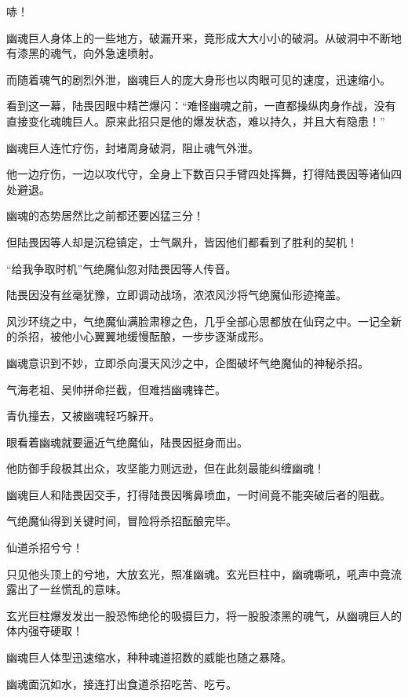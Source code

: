 
\begin{this_body}

哧！

幽魂巨人身体上的一些地方，破漏开来，竟形成大大小小的破洞。从破洞中不断地有漆黑的魂气，向外急速喷射。

而随着魂气的剧烈外泄，幽魂巨人的庞大身形也以肉眼可见的速度，迅速缩小。

看到这一幕，陆畏因眼中精芒爆闪：“难怪幽魂之前，一直都操纵肉身作战，没有直接变化魂魄巨人。原来此招只是他的爆发状态，难以持久，并且大有隐患！”

幽魂巨人连忙疗伤，封堵周身破洞，阻止魂气外泄。

他一边疗伤，一边以攻代守，全身上下数百只手臂四处挥舞，打得陆畏因等诸仙四处避退。

幽魂的态势居然比之前都还要凶猛三分！

但陆畏因等人却是沉稳镇定，士气飙升，皆因他们都看到了胜利的契机！

“给我争取时机”气绝魔仙忽对陆畏因等人传音。

陆畏因没有丝毫犹豫，立即调动战场，浓浓风沙将气绝魔仙形迹掩盖。

风沙环绕之中，气绝魔仙满脸肃穆之色，几乎全部心思都放在仙窍之中。一记全新的杀招，被他小心翼翼地缓慢酝酿，一步步逐渐成形。

幽魂意识到不妙，立即杀向漫天风沙之中，企图破坏气绝魔仙的神秘杀招。

气海老祖、吴帅拼命拦截，但难挡幽魂锋芒。

青仇撞去，又被幽魂轻巧躲开。

眼看着幽魂就要逼近气绝魔仙，陆畏因挺身而出。

他防御手段极其出众，攻坚能力则远逊，但在此刻最能纠缠幽魂！

幽魂巨人和陆畏因交手，打得陆畏因嘴鼻喷血，一时间竟不能突破后者的阻截。

气绝魔仙得到关键时间，冒险将杀招酝酿完毕。

仙道杀招兮兮！

只见他头顶上的兮地，大放玄光，照准幽魂。玄光巨柱中，幽魂嘶吼，吼声中竟流露出了一丝慌乱的意味。

玄光巨柱爆发发出一股恐怖绝伦的吸摄巨力，将一股股漆黑的魂气，从幽魂巨人的体内强夺硬取！

幽魂巨人体型迅速缩水，种种魂道招数的威能也随之暴降。

幽魂面沉如水，接连打出食道杀招吃苦、吃亏。


\end{this_body}
